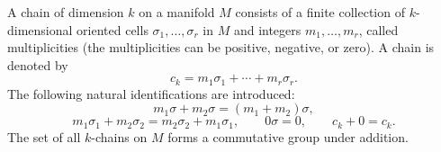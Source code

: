 A chain of dimension $k$ on a manifold $M$ consists of a finite collection of $k$-dimensional oriented cells $\sigma_1, \ldots, \sigma_r$ in $M$ and integers $m_1, \ldots, m_r$, called multiplicities (the multiplicities can be positive, negative, or zero). A chain is denoted by
$$c_k = m_1 \sigma_1 + \cdots + m_r \sigma_r.$$
The following natural identifications are introduced:
$$m_1 \sigma + m_2 \sigma = (m_1 + m_2) \sigma,$$
$$m_1 \sigma_1 + m_2 \sigma_2 = m_2 \sigma_2 + m_1 \sigma_1, \qquad 0 \sigma = 0, \qquad c_k + 0 = c_k.$$
The set of all $k$-chains on $M$ forms a commutative group under addition.
